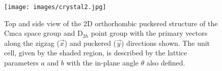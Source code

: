 \begin{figure}[th!]
\centering
\texttt{[image: images/crystal2.jpg]}
  \label{fig:crystalstructure}
\caption[Crystal structure of orthorhombic black phosphorus]
{Top and side view of the 
2D orthorhombic puckered structure 
of the Cmca space group and D$_{2h}$ point group 
with the primary vectors along the 
zigzag ($\vec x$) and puckered ($\vec y$) directions shown. 
The unit cell, 
given by the shaded region, 
is described by the lattice parameters $a$ and $b$ 
with the in-plane angle $\theta$ also defined.
}
\label{fig:phos_structure}
\end{figure}

